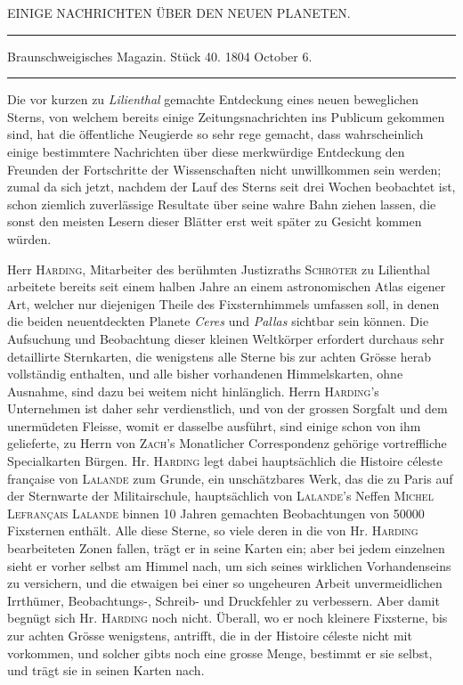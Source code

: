 \clearpage
{}
\hypertarget{native-258-lower}{}
\begin{center}
EINIGE NACHRICHTEN ÜBER DEN NEUEN PLANETEN.

\rule{0.75\linewidth}{0.4pt}

Braunschweigisches Magazin. Stück 40. 1804 October 6.

\rule{0.75\linewidth}{0.4pt}
\end{center}

Die vor kurzen zu \emph{Lilienthal} gemachte Entdeckung eines neuen beweglichen Sterns, von welchem bereits einige Zeitungsnachrichten ins Publicum gekommen sind, hat die öffentliche Neugierde so sehr rege gemacht, dass wahrscheinlich einige bestimmtere Nachrichten über diese merkwürdige Entdeckung den Freunden der Fortschritte der Wissenschaften nicht unwillkommen sein werden; zumal da sich
jetzt, nachdem der Lauf des Sterns seit drei Wochen beobachtet ist, schon ziemlich zuverlässige Resultate über seine wahre Bahn ziehen lassen, die sonst den meisten Lesern dieser Blätter erst weit später zu Gesicht kommen würden.

Herr \textsc{Harding}, Mitarbeiter des berühmten Justizraths \textsc{Schröter} zu Lilienthal arbeitete bereits seit einem halben Jahre an einem astronomischen Atlas eigener Art, welcher nur diejenigen Theile des Fixsternhimmels umfassen soll, in denen die beiden neuentdeckten Planete \emph{Ceres} und \emph{Pallas} sichtbar sein können. Die Aufsuchung und Beobachtung dieser kleinen Weltkörper erfordert durchaus sehr detaillirte Sternkarten, die wenigstens alle Sterne bis zur achten Grösse herab vollständig enthalten, und alle bisher vorhandenen Himmelskarten, ohne Ausnahme, sind dazu bei weitem nicht hinlänglich. Herrn \textsc{Harding}'s Unternehmen ist daher sehr verdienstlich, und von der grossen Sorgfalt und dem unermüdeten Fleisse, womit er dasselbe ausführt, sind einige schon von ihm gelieferte, zu Herrn von \textsc{Zach}'s Monatlicher Correspondenz gehörige vortreffliche Specialkarten Bürgen. Hr. \textsc{Harding} legt dabei hauptsächlich die Histoire céleste française von \textsc{Lalande} zum Grunde, ein unschätzbares Werk, das die zu Paris auf der Sternwarte der Militairschule,
 hauptsächlich von \textsc{Lalande}'s Neffen \textsc{Michel Lefrançais Lalande} binnen 10 Jahren gemachten Beobachtungen von 50000 Fixsternen enthält. Alle diese Sterne, so viele deren in die von Hr. \textsc{Harding} bearbeiteten Zonen fallen, trägt er in seine Karten ein; aber bei jedem einzelnen sieht er vorher selbst am Himmel nach, um sich seines wirklichen Vorhandenseins zu versichern, und die etwaigen bei einer so ungeheuren Arbeit unvermeidlichen Irrthümer, Beobachtungs-, Schreib- und Druckfehler zu verbessern. Aber damit begnügt sich Hr. \textsc{Harding} noch nicht. Überall, wo er noch kleinere Fixsterne, bis zur achten Grösse wenigstens, antrifft, die in der Histoire céleste nicht mit vorkommen, und solcher gibts noch eine grosse Menge, bestimmt er sie selbst, und trägt sie in seinen Karten nach.

